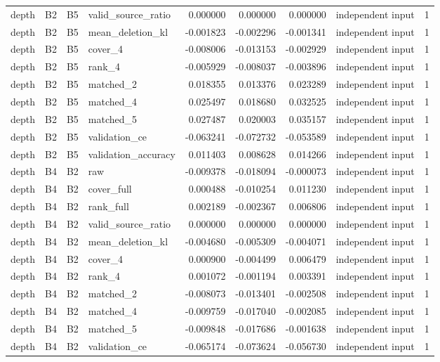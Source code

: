 \begin{tabular}{llllrrrlr}
depth & B2 & B5 & valid_source_ratio & 0.000000 & 0.000000 & 0.000000 & independent input & 1 \\
depth & B2 & B5 & mean_deletion_kl & -0.001823 & -0.002296 & -0.001341 & independent input & 1 \\
depth & B2 & B5 & cover_4 & -0.008006 & -0.013153 & -0.002929 & independent input & 1 \\
depth & B2 & B5 & rank_4 & -0.005929 & -0.008037 & -0.003896 & independent input & 1 \\
depth & B2 & B5 & matched_2 & 0.018355 & 0.013376 & 0.023289 & independent input & 1 \\
depth & B2 & B5 & matched_4 & 0.025497 & 0.018680 & 0.032525 & independent input & 1 \\
depth & B2 & B5 & matched_5 & 0.027487 & 0.020003 & 0.035157 & independent input & 1 \\
depth & B2 & B5 & validation_ce & -0.063241 & -0.072732 & -0.053589 & independent input & 1 \\
depth & B2 & B5 & validation_accuracy & 0.011403 & 0.008628 & 0.014266 & independent input & 1 \\
depth & B4 & B2 & raw & -0.009378 & -0.018094 & -0.000073 & independent input & 1 \\
depth & B4 & B2 & cover_full & 0.000488 & -0.010254 & 0.011230 & independent input & 1 \\
depth & B4 & B2 & rank_full & 0.002189 & -0.002367 & 0.006806 & independent input & 1 \\
depth & B4 & B2 & valid_source_ratio & 0.000000 & 0.000000 & 0.000000 & independent input & 1 \\
depth & B4 & B2 & mean_deletion_kl & -0.004680 & -0.005309 & -0.004071 & independent input & 1 \\
depth & B4 & B2 & cover_4 & 0.000900 & -0.004499 & 0.006479 & independent input & 1 \\
depth & B4 & B2 & rank_4 & 0.001072 & -0.001194 & 0.003391 & independent input & 1 \\
depth & B4 & B2 & matched_2 & -0.008073 & -0.013401 & -0.002508 & independent input & 1 \\
depth & B4 & B2 & matched_4 & -0.009759 & -0.017040 & -0.002085 & independent input & 1 \\
depth & B4 & B2 & matched_5 & -0.009848 & -0.017686 & -0.001638 & independent input & 1 \\
depth & B4 & B2 & validation_ce & -0.065174 & -0.073624 & -0.056730 & independent input & 1 \\

\end{tabular}
